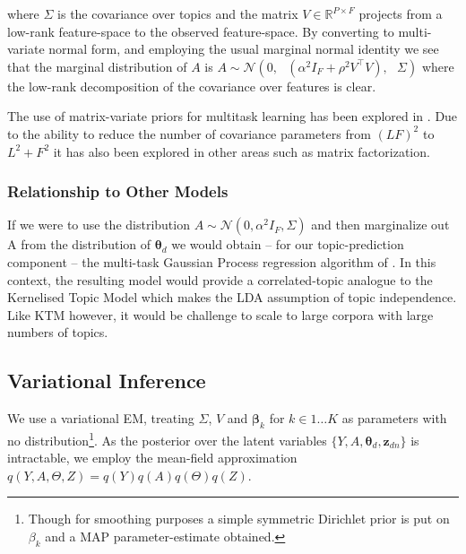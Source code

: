 \documentclass[10pt,fleqn]{article}
\newcommand \T { ^\top }
\newcommand \vv[1] { \bm #1 }
\newcommand \Ed {{ \vv{\xi}_d}}
\newcommand \Axi { { \Lambda_{\xi} } }
\newcommand \bxi { { \vv{b}_{\xi} } }
\newcommand \cxi { { c_{\xi} } }
\newcommand \zdn[0]  { { \vv{z}_{dn} } }
\newcommand \thd[0]  { { \vv \theta_d } }
\newcommand \mnor[3]  { \mathcal{N} \left(#1, #2, #3\right) }
\newcommand \beta[1]  { \mathcal{B}eta \left( {#1}, {#2} \right) }
\newcommand \MReal[2] { { \mathbb{R}^{#1 \times #2} } }
\newcommand \md   { \vv{m}_d }
\newcommand \one  {{  \mathds{1} }}
\newcommand \lse { \text{lse} }
\begin{document}
where $\Sigma$ is the covariance over topics and the matrix $V \in \MReal{P}{F}$ projects from a low-rank feature-space to the observed feature-space. By converting to multi-variate normal form, and employing the usual marginal normal identity\cite{Bishop2006}  we see that the marginal distribution of $A$ is
$ A \sim \mnor{0}{\text{ }(\alpha^2 I_F + \rho^2 V\T V)}{\text{ }\Sigma}$ where the low-rank decomposition of the covariance over features is clear. 

The use of matrix-variate priors for multitask learning has been explored in \cite{Stegle2011}\cite{Bonilla2008} \cite{Archambeau2011}\cite{Yang2011}. Due to the ability to reduce the number of covariance parameters from $(LF)^2$ to $L^2 + F^2$ it has also been explored in other areas such as matrix factorization\cite{Allen2010}.

\subsubsection*{Relationship to Other Models}
If we were to use the distribution $A \sim \mnor{0}{\alpha^2 I_F}{\Sigma}$ and then marginalize out A from the distribution of $\thd$ we would obtain -- for our topic-prediction component -- the multi-task Gaussian Process regression algorithm of \cite{Bonilla2008}. In this context, the resulting model would provide a correlated-topic analogue to the Kernelised Topic Model \cite{Hennig2012} which makes the LDA assumption of topic independence. Like KTM however, it would be challenge to scale to large corpora with large numbers of topics.

\subsection{Variational Inference}
\newcommand \onek { \one_K }
\newcommand \md { \vv{m}_d }
\newcommand \Vd { V^{(d)} }


\newcommand \sigmoid[1] { {  \vv{\sigma}\left( #1 \right)  } }
\newcommand \sigmoidk[1] { {  \sigmoidat{#1}{k}  } }
\newcommand \sigmoidat[2] { {  \sigma_{#2}\left( #1 \right)  } }
\newcommand \ged { { \nabla_{\Ed} } }
\newcommand \gesig { { \ged \left[ \sigmoid{\Ed} \right] } }

We use a variational EM, treating $\Sigma$, $V$ and $\vv{\beta}_k$ for $k \in 1\ldots K$ as parameters with no distribution\footnote{Though for smoothing purposes a simple symmetric Dirichlet prior is put on $\beta_k$ and a MAP parameter-estimate obtained.}. As the posterior over the latent variables $\{Y, A, \thd, \zdn\}$ is intractable, we employ the mean-field approximation $q(Y, A, \Theta, Z) = q(Y)q(A)q(\Theta)q(Z)$. 
\end{document}
